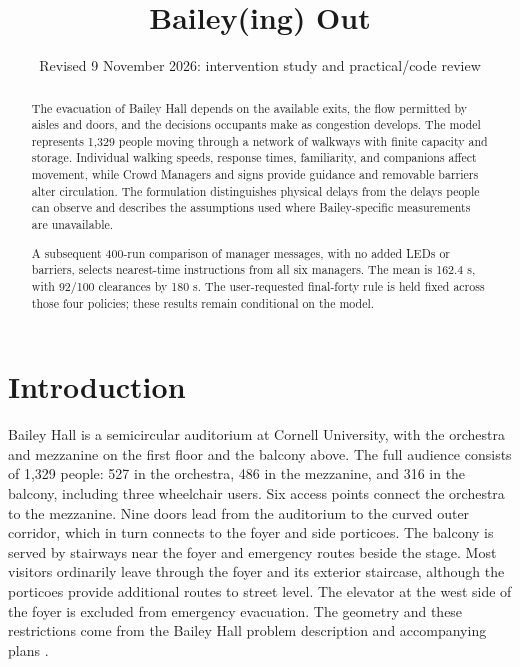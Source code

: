 \documentclass[11pt,a4paper]{article}
\title{Bailey(ing) Out}
\author{}
\date{Revised 9 November 2026: intervention study and practical/code review}
\begin{document}

\clearpage
\maketitle
\vspace{-2em}

\begin{abstract}
The evacuation of Bailey Hall depends on the available exits, the flow permitted by aisles and doors, and the decisions occupants make as congestion develops. The model represents 1,329 people moving through a network of walkways with finite capacity and storage. Individual walking speeds, response times, familiarity, and companions affect movement, while Crowd Managers and signs provide guidance and removable barriers alter circulation. The formulation distinguishes physical delays from the delays people can observe and describes the assumptions used where Bailey-specific measurements are unavailable.



A subsequent 400-run comparison of manager messages, with no added LEDs or barriers, selects nearest-time instructions from all six managers. The mean is 162.4 s, with 92/100 clearances by 180 s. The user-requested final-forty rule is held fixed across those four policies; these results remain conditional on the model.
\end{abstract}

\section{Introduction}

Bailey Hall is a semicircular auditorium at Cornell University, with the orchestra and mezzanine on the first floor and the balcony above. The full audience consists of 1,329 people: 527 in the orchestra, 486 in the mezzanine, and 316 in the balcony, including three wheelchair users. Six access points connect the orchestra to the mezzanine. Nine doors lead from the auditorium to the curved outer corridor, which in turn connects to the foyer and side porticoes. The balcony is served by stairways near the foyer and emergency routes beside the stage. Most visitors ordinarily leave through the foyer and its exterior staircase, although the porticoes provide additional routes to street level. The elevator at the west side of the foyer is excluded from emergency evacuation. The geometry and these restrictions come from the Bailey Hall problem description and accompanying plans \cite{brief}.
\end{document}
